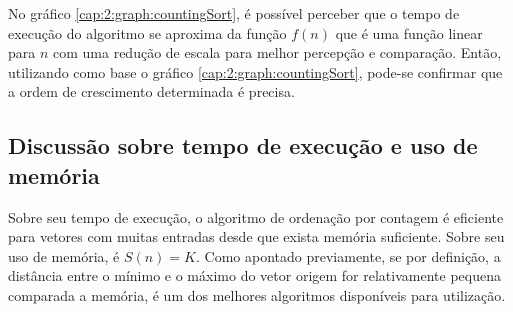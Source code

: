 No gráfico \ref{cap:2:graph:countingSort}, é possível perceber que o tempo de execução do algoritmo se aproxima
da função $f(n)$ que é uma função linear para $n$ com uma redução de escala para melhor percepção e comparação. Então,
utilizando como base o gráfico \ref{cap:2:graph:countingSort}, pode-se confirmar que a ordem de crescimento determinada é
precisa.

\subsection{Discussão sobre tempo de execução e uso de memória}

Sobre seu tempo de execução, o algoritmo de ordenação por contagem é eficiente para
vetores com muitas entradas desde que exista memória suficiente. Sobre seu uso de memória, é $S(n) = K$.
Como apontado previamente, se por definição, a distância entre o mínimo e o máximo do vetor origem for
relativamente pequena comparada a memória, é um dos melhores algoritmos disponíveis para utilização.

